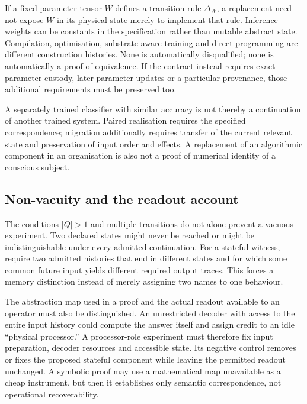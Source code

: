 If a fixed parameter tensor $W$ defines a transition rule $\Delta_W$, a replacement need not expose $W$ in its physical state merely to implement that rule. Inference weights can be constants in the specification rather than mutable abstract state. Compilation, optimisation, substrate-aware training and direct programming are different construction histories. None is automatically disqualified; none is automatically a proof of equivalence. If the contract instead requires exact parameter custody, later parameter updates or a particular provenance, those additional requirements must be preserved too.

A separately trained classifier with similar accuracy is not thereby a continuation of another trained system. Paired realisation requires the specified correspondence; migration additionally requires transfer of the current relevant state and preservation of input order and effects. A replacement of an algorithmic component in an organisation is also not a proof of numerical identity of a conscious subject.

\subsection{Non-vacuity and the readout account}\label{subsec:nonvacuity}
The conditions $|Q|>1$ and multiple transitions do not alone prevent a vacuous experiment. Two declared states might never be reached or might be indistinguishable under every admitted continuation. For a stateful witness, require two admitted histories that end in different states and for which some common future input yields different required output traces. This forces a memory distinction instead of merely assigning two names to one behaviour.

The abstraction map used in a proof and the actual readout available to an operator must also be distinguished. An unrestricted decoder with access to the entire input history could compute the answer itself and assign credit to an idle ``physical processor.'' A processor-role experiment must therefore fix input preparation, decoder resources and accessible state. Its negative control removes or fixes the proposed stateful component while leaving the permitted readout unchanged. A symbolic proof may use a mathematical map unavailable as a cheap instrument, but then it establishes only semantic correspondence, not operational recoverability.

